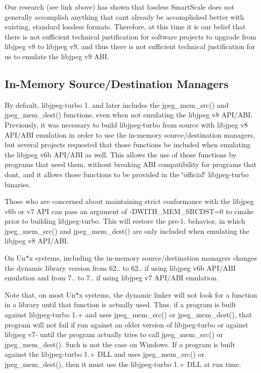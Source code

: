 Our research (see link above) has shown that lossless Smart\+Scale does not generally accomplish anything that can\textquotesingle{}t already be accomplished better with existing, standard lossless formats. Therefore, at this time it is our belief that there is not sufficient technical justification for software projects to upgrade from libjpeg v8 to libjpeg v9, and thus there is not sufficient technical justification for us to emulate the libjpeg v9 A\+BI.

\subsection*{In-\/\+Memory Source/\+Destination Managers }

By default, libjpeg-\/turbo 1. and later includes the {\ttfamily jpeg\+\_\+mem\+\_\+src()} and {\ttfamily jpeg\+\_\+mem\+\_\+dest()} functions, even when not emulating the libjpeg v8 A\+P\+I/\+A\+BI. Previously, it was necessary to build libjpeg-\/turbo from source with libjpeg v8 A\+P\+I/\+A\+BI emulation in order to use the in-\/memory source/destination managers, but several projects requested that those functions be included when emulating the libjpeg v6b A\+P\+I/\+A\+BI as well. This allows the use of those functions by programs that need them, without breaking A\+BI compatibility for programs that don\textquotesingle{}t, and it allows those functions to be provided in the \char`\"{}official\char`\"{} libjpeg-\/turbo binaries.

Those who are concerned about maintaining strict conformance with the libjpeg v6b or v7 A\+PI can pass an argument of {\ttfamily -\/\+D\+W\+I\+T\+H\+\_\+\+M\+E\+M\+\_\+\+S\+R\+C\+D\+ST=0} to {\ttfamily cmake} prior to building libjpeg-\/turbo. This will restore the pre-\/1. behavior, in which {\ttfamily jpeg\+\_\+mem\+\_\+src()} and {\ttfamily jpeg\+\_\+mem\+\_\+dest()} are only included when emulating the libjpeg v8 A\+P\+I/\+A\+BI.

On Un$\ast$x systems, including the in-\/memory source/destination managers changes the dynamic library version from 62.. to 62.. if using libjpeg v6b A\+P\+I/\+A\+BI emulation and from 7.. to 7.. if using libjpeg v7 A\+P\+I/\+A\+BI emulation.

Note that, on most Un$\ast$x systems, the dynamic linker will not look for a function in a library until that function is actually used. Thus, if a program is built against libjpeg-\/turbo 1.+ and uses {\ttfamily jpeg\+\_\+mem\+\_\+src()} or {\ttfamily jpeg\+\_\+mem\+\_\+dest()}, that program will not fail if run against an older version of libjpeg-\/turbo or against libjpeg v7-\/ until the program actually tries to call {\ttfamily jpeg\+\_\+mem\+\_\+src()} or {\ttfamily jpeg\+\_\+mem\+\_\+dest()}. Such is not the case on Windows. If a program is built against the libjpeg-\/turbo 1.+ D\+LL and uses {\ttfamily jpeg\+\_\+mem\+\_\+src()} or {\ttfamily jpeg\+\_\+mem\+\_\+dest()}, then it must use the libjpeg-\/turbo 1.+ D\+LL at run time.

